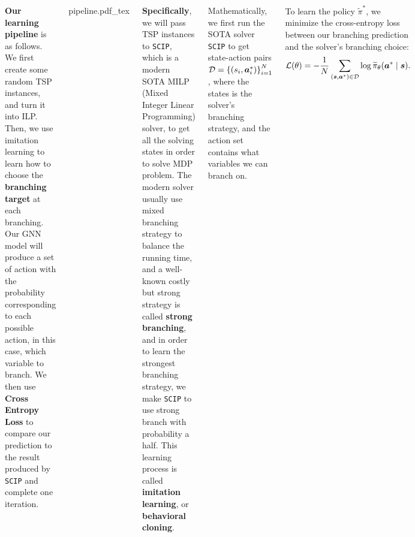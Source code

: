 \documentclass[20pt,,margin=1in,innermargin=-4.5in,blockverticalspace=-0.25in]{tikzposter}
\newcommand{\incfig}[1]{%
	\def\svgwidth{0.35\columnwidth}
	{#1.pdf_tex}
}
\begin{document}
\begin{columns}
{	\vspace{1em}
	\textbf{Our learning pipeline} is as follows. We first create some random TSP instances, and turn it into ILP.
	Then, we use imitation learning to learn how to choose the \textbf{branching target} at each branching.
	Our GNN model will produce a set of action with the probability corresponding to each possible action, in this
	case, which variable to branch. We then use \textbf{Cross Entropy Loss} to compare our prediction to the result
	produced by \texttt{SCIP} and complete one iteration.
	\begin{tikzfigure}
		\centering
		\incfig{pipeline}
	\end{tikzfigure}
	\textbf{Specifically}, we will pass TSP instances to \texttt{SCIP}, which is a modern SOTA MILP (Mixed Integer Linear Programming) solver, to get all
	the solving states in order to solve MDP problem. The modern solver usually use mixed branching strategy to balance the running
	time, and a well-known costly but strong strategy is called \textbf{strong branching}, and in order to learn the strongest branching strategy, we make
	\texttt{SCIP} to use strong branch with probability a half. This learning process is called \textbf{imitation learning}, or \textbf{behavioral
		cloning}.

	Mathematically, we first run the SOTA solver \texttt{SCIP} to get state-action pairs \(\mathcal{\MakeUppercase{d}} = \left\{(s_{i} , \bm{a} _{i} ^\ast)\right\}_{i = 1}^N\),
	where the states is the solver's branching strategy, and the action set contains what variables we can branch on.


	To learn the policy \(\widetilde{\pi} ^\ast\), we minimize the cross-entropy loss between our branching prediction and the solver's branching choice:
	\[
		\mathcal{\MakeUppercase{l}} (\theta ) = - \frac{1}{N}\sum\limits_{(\bm{s}, \bm{a}^\ast)\in \mathcal{\MakeUppercase{d}} }\log \widetilde{\pi}_\theta (\bm{a} ^\ast \mid \bm{s} ).
	\]

}
\end{columns}
\end{document}
